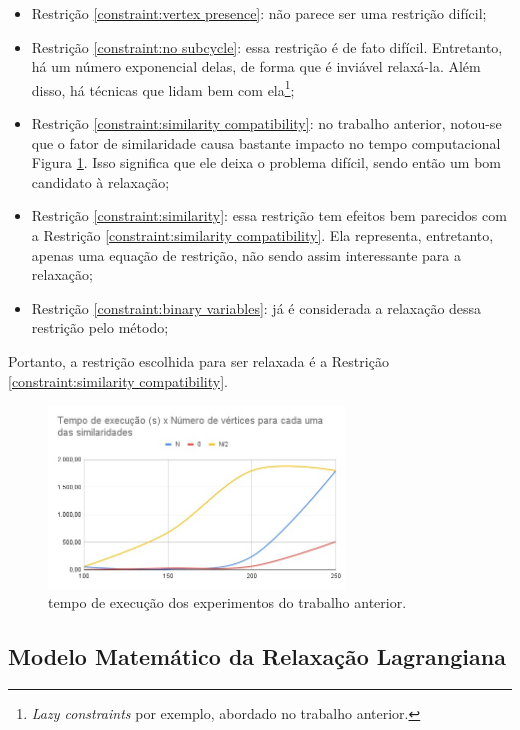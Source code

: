 \documentclass{article}
\newcommand{\constraintRef}[1]{Restrição \ref{#1}}
\newcommand{\figref}[1]{Figura \ref{#1}}
\begin{document}
\begin{itemize}
	\item \constraintRef{constraint:vertex presence}: não parece ser uma restrição difícil;
	\item \constraintRef{constraint:no subcycle}: essa restrição é de fato difícil. Entretanto, há um número exponencial delas, de forma que é inviável relaxá-la. Além disso, há técnicas que lidam bem com ela\footnote{\textit{Lazy constraints} por exemplo, abordado no trabalho anterior.};
	\item \constraintRef{constraint:similarity compatibility}: no trabalho anterior, notou-se que o fator de similaridade causa bastante impacto no tempo computacional \figref{figure:previous running time}. Isso significa que ele deixa o problema difícil, sendo então um bom candidato à relaxação;
	\item \constraintRef{constraint:similarity}: essa restrição tem efeitos bem parecidos com a \constraintRef{constraint:similarity compatibility}. Ela representa, entretanto, apenas uma equação de restrição, não sendo assim interessante para a relaxação;
	\item \constraintRef{constraint:binary variables}: já é considerada a relaxação dessa restrição pelo método;
\end{itemize}

Portanto, a restrição escolhida para ser relaxada é a \constraintRef{constraint:similarity compatibility}.

\begin{figure}
    \centering
    \includegraphics[width=0.7\textwidth]{images/running_time.jpeg}
    \caption{tempo de execução dos experimentos do trabalho anterior.}
    \label{figure:previous running time}
\end{figure}

\subsection{Modelo Matemático da Relaxação Lagrangiana}
\label{subsec:lagrangian relaxation}
\end{document}
